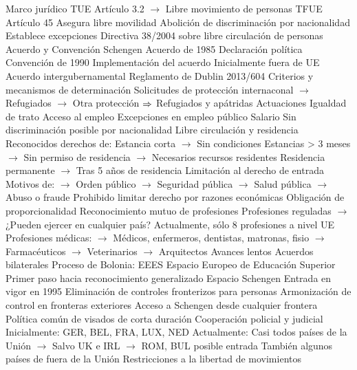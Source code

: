 \documentclass{nuevotema}
\begin{document}
\begin{esquemal}
		\2 Marco jurídico
			\3 TUE
				\4 Artículo 3.2
				\4[] $\to$ Libre movimiento de personas
			\3 TFUE
				\4 Artículo 45
				\4[] Asegura libre movilidad
				\4[] Abolición de discriminación por nacionalidad
				\4[] Establece excepciones
			\3 Directiva 38/2004 sobre libre circulación de personas
			\3 Acuerdo y Convención Schengen
				\4 Acuerdo de 1985
				\4[] Declaración política
				\4 Convención de 1990
				\4[] Implementación del acuerdo
				\4 Inicialmente fuera de UE
				\4[] Acuerdo intergubernamental
			\3 Reglamento de Dublin 2013/604
				\4 Criterios y mecanismos de determinación
				\4[] Solicitudes de protección internaconal
				\4[] $\to$ Refugiados
				\4[] $\to$ Otra protección
				\4[] $\Rightarrow$ Refugiados y apátridas
		\2 Actuaciones
			\3 Igualdad de trato
				\4 Acceso al empleo
				\4[] Excepciones en empleo público
				\4 Salario
				\4[] Sin discriminación posible por nacionalidad
			\3 Libre circulación y residencia
				\4 Reconocidos derechos de:
				\4[] Estancia corta
				\4[] $\to$ Sin condiciones
				\4[] Estancias > 3 meses
				\4[] $\to$ Sin permiso de residencia
				\4[] $\to$ Necesarios recursos residentes
				\4[] Residencia permanente
				\4[] $\to$ Tras 5 años de residencia
				\4 Limitación al derecho de entrada
				\4[] Motivos de:
				\4[] $\to$ Orden público
				\4[] $\to$ Seguridad pública
				\4[] $\to$ Salud pública
				\4[] $\to$ Abuso o fraude
				\4[] Prohibido limitar derecho por razones económicas
				\4[] Obligación de proporcionalidad
			\3 Reconocimiento mutuo de profesiones
				\4 Profesiones reguladas
				\4[] $\to$ ¿Pueden ejercer en cualquier país?
				\4 Actualmente, sólo 8 profesiones a nivel UE
				\4[] Profesiones médicas:
				\4[] $\to$ Médicos, enfermeros, dentistas, matronas, fisio
				\4[] $\to$ Farmacéuticos
				\4[] $\to$ Veterinarios
				\4[] $\to$ Arquitectos
				\4[] Avances lentos
				\4[] Acuerdos bilaterales
				\4 Proceso de Bolonia: EEES
				\4[] Espacio Europeo de Educación Superior
				\4[] Primer paso hacia reconocimiento generalizado
			\3 Espacio Schengen
				\4 Entrada en vigor en 1995
				\4 Eliminación de controles fronterizos para personas
				\4 Armonización de control en fronteras exteriores
				\4[] Acceso a Schengen desde cualquier frontera
				\4 Política común de visados de corta duración
				\4 Cooperación policial y judicial
				\4 Inicialmente:
				\4[] GER, BEL, FRA, LUX, NED
				\4 Actualmente:
				\4[] Casi todos países de la Unión
				\4[] $\to$ Salvo UK e IRL
				\4[] $\to$ ROM, BUL posible entrada
				\4[] También algunos países de fuera de la Unión
			\3 Restricciones a la libertad de movimientos

\end{esquemal}
\end{document}
